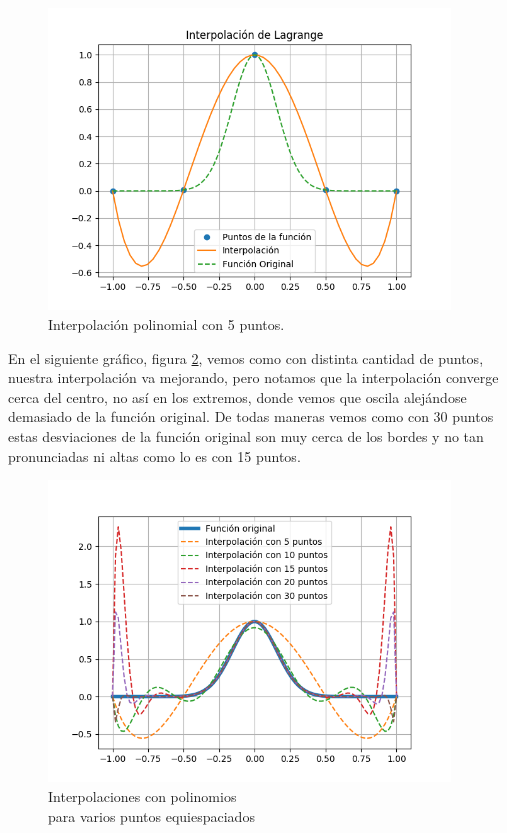 \documentclass[letter, 11pt]{article}
\begin{document}
\begin{figure}[H]
  \centering
  \includegraphics[height=8cm]{P1_1.png}
  \caption{Interpolación polinomial con 5 puntos.}
  \label{P1_1}
\end{figure}


En el siguiente gráfico, figura \ref{P1_2}, vemos como con
distinta cantidad de puntos, nuestra interpolación va mejorando,
pero notamos que la interpolación converge cerca del centro, no
así en los extremos, donde vemos que oscila alejándose demasiado
de la función original. De todas maneras vemos como con 30
puntos estas desviaciones de la función original son muy cerca
de los bordes y no tan pronunciadas ni altas como lo es con 15
puntos.



\begin{figure}[H]
  \centering
  \includegraphics[height=8cm]{P1_2.png}
  \caption{Interpolaciones con polinomios\\ para varios puntos equiespaciados}
  \label{P1_2}
\end{figure}
\end{document}
